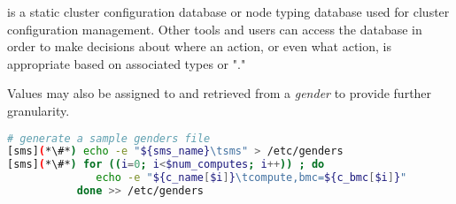\genders{} is a static cluster configuration database or node typing database
used for cluster configuration management. Other tools and users can access the
\genders{} database in order to make decisions about where an action, or even
what action, is appropriate based on associated types or "\genders{}."

Values may also be assigned to and retrieved from a {\em gender} to provide
further granularity.

\begin{lstlisting}[language=bash,keywords={},upquote=true]
# generate a sample genders file
[sms](*\#*) echo -e "${sms_name}\tsms" > /etc/genders
[sms](*\#*) for ((i=0; i<$num_computes; i++)) ; do
              echo -e "${c_name[$i]}\tcompute,bmc=${c_bmc[$i]}"
           done >> /etc/genders
\end{lstlisting}


